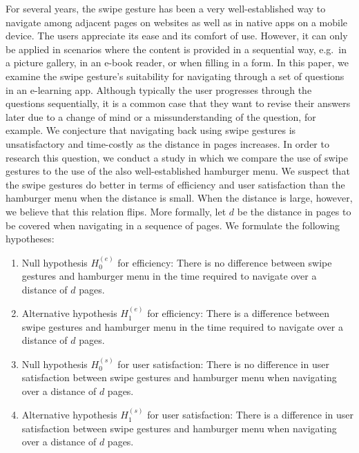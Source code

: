 \documentclass{sig-alternate-05-2015}
\begin{document}
For several years, the swipe gesture has been a very well-established way to
navigate among adjacent pages on websites as well as in native apps on a
mobile device. The users appreciate its ease and its comfort of use. However,
it can only be applied in scenarios where the content is provided in a
sequential way, e.g.\ in a picture gallery, in an e-book reader, or when
filling in a form. In this paper, we examine the swipe gesture's suitability
for navigating through a set of questions in an e-learning app. Although
typically the user progresses through the questions sequentially, it is a
common case that they want to revise their answers later due to a change of
mind or a missunderstanding of the question, for example. We conjecture that
navigating back using swipe gestures is unsatisfactory and time-costly as the
distance in pages increases. In order to research this question, we conduct a
study in which we compare the use of swipe gestures to the use of the also
well-established hamburger menu. We suspect that the swipe gestures do better
in terms of efficiency and user satisfaction than the hamburger menu when the
distance is small. When the distance is large, however, we believe that this
relation flips. More formally, let $d$ be the distance in pages to be covered
when navigating in a sequence of pages.  We formulate the following
hypotheses:
\begin{enumerate}
  \item Null hypothesis $H_0^{(e)}$ for efficiency:
    There is no difference between swipe gestures and hamburger menu in the
    time required to navigate over a distance of $d$ pages.
  \item Alternative hypothesis $H_1^{(e)}$ for efficiency: There is a
    difference between swipe gestures and hamburger menu in the time required
    to navigate over a distance of $d$ pages.
  \item Null hypothesis $H_0^{(s)}$ for user satisfaction: There is no
    difference in user satisfaction between swipe gestures and hamburger menu
    when navigating over a distance of $d$ pages.
  \item Alternative hypothesis $H_1^{(s)}$ for user satisfaction: There is a
    difference in user satisfaction between swipe gestures and hamburger menu
    when navigating over a distance of $d$ pages.
\end{enumerate}
\end{document}
